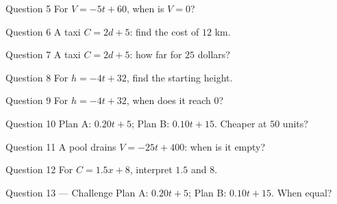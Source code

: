 \documentclass[11pt]{article}
\begin{document}
\begin{qbox}{Question 5}
For $V=-5t+60$, when is $V=0$?\workspace{2.0cm}
\end{qbox}

\begin{qbox}{Question 6}
A taxi $C=2d+5$: find the cost of $12$ km.\workspace{2.0cm}
\end{qbox}

\begin{qbox}{Question 7}
A taxi $C=2d+5$: how far for $25$ dollars?\workspace{2.0cm}
\end{qbox}

\begin{qbox}{Question 8}
For $h=-4t+32$, find the starting height.\workspace{2.0cm}
\end{qbox}

\begin{qbox}{Question 9}
For $h=-4t+32$, when does it reach $0$?\workspace{2.0cm}
\end{qbox}

\begin{qbox}{Question 10}
Plan A: $0.20t+5$; Plan B: $0.10t+15$. Cheaper at $50$ units?\workspace{2.2cm}
\end{qbox}

\begin{qbox}{Question 11}
A pool drains $V=-25t+400$: when is it empty?\workspace{2.2cm}
\end{qbox}

\begin{qbox}{Question 12}
For $C=1.5x+8$, interpret $1.5$ and $8$.\workspace{2.2cm}
\end{qbox}

\begin{qbox}{Question 13 --- Challenge}
Plan A: $0.20t+5$; Plan B: $0.10t+15$. When equal?\workspace{2.4cm}
\end{qbox}

\clearpage
{}
\end{document}

